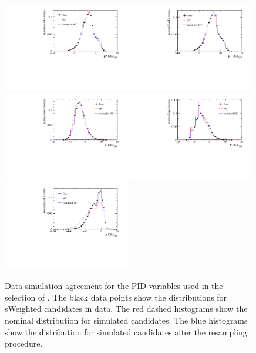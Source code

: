 \begin{figure}[!tb]
 \centering
 \includegraphics[width=0.49\textwidth]{figs/kpimm/data-mc/resampling/Muplus_PIDmu.pdf}
 \includegraphics[width=0.49\textwidth]{figs/kpimm/data-mc/resampling/Muminus_PIDmu.pdf}
 \includegraphics[width=0.49\textwidth]{figs/kpimm/data-mc/resampling/K_PIDmu.pdf}
 \includegraphics[width=0.49\textwidth]{figs/kpimm/data-mc/resampling/Pi_PIDmu.pdf}
 \includegraphics[width=0.49\textwidth]{figs/kpimm/data-mc/resampling/Pi_PIDp.pdf}
 \caption{Data-simulation agreement for the PID variables used in the selection of \BdToKpimm. The black data points show the distributions for sWeighted \BdToJPsiKst candidates in data. The red dashed histograms show the nominal distribution for simulated \BdToJPsiKst candidates. The blue histograms show the distribution for simulated \BdToJPsiKst candidates after the resampling procedure.}
\label{fig:kpimm:data-mc:pid}
\end{figure}

